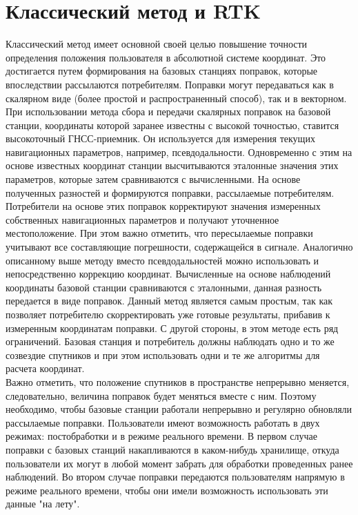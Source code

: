 \documentclass[a4paper,12pt]{report}
\begin{document}
\section*{Классический метод и RTK}
Классический метод имеет основной своей целью повышение точности определения положения пользователя в абсолютной системе координат. Это 
достигается путем формирования на базовых станциях поправок, которые впоследствии рассылаются потребителям. Поправки могут передаваться 
как в скалярном виде (более простой и распространенный способ), так и в векторном. При использовании метода сбора и передачи скалярных 
поправок на базовой станции, координаты которой заранее известны с высокой точностью, ставится высокоточный ГНСС-приемник. Он используется 
для измерения текущих навигационных параметров, например, псевдодальности. Одновременно с этим на основе известных координат станции 
высчитываются эталонные значения этих параметров, которые затем сравниваются с вычисленными. На основе полученных разностей и формируются 
поправки, рассылаемые потребителям. Потребители на основе этих поправок корректируют значения измеренных собственных навигационных параметров 
и получают уточненное местоположение. При этом важно отметить, что пересылаемые поправки учитывают все составляющие погрешности, содержащейся 
в сигнале. Аналогично описанному выше методу вместо псевдодальностей можно использовать и непосредственно коррекцию координат. Вычисленные на 
основе наблюдений координаты базовой станции сравниваются с эталонными, данная разность передается в виде поправок. Данный метод является самым 
простым, так как позволяет потребителю скорректировать уже готовые результаты, прибавив к измеренным координатам поправки. С другой стороны, 
в этом методе есть ряд ограничений. Базовая станция и потребитель должны наблюдать одно и то же созвездие спутников и при этом использовать 
одни и те же алгоритмы для расчета координат. \\
Важно отметить, что положение спутников в пространстве непрерывно меняется, следовательно, величина поправок будет меняться вместе с ним. 
Поэтому необходимо, чтобы базовые станции работали непрерывно и регулярно обновляли рассылаемые поправки. Пользователи имеют возможность 
работать в двух режимах: постобработки и в режиме реального времени. В первом случае поправки с базовых станций накапливаются в каком-нибудь 
хранилище, откуда пользователи их могут в любой момент забрать для обработки проведенных ранее наблюдений. Во втором случае поправки передаются 
пользователям напрямую в режиме реального времени, чтобы они имели возможность использовать эти данные "на лету". \\
\end{document}
